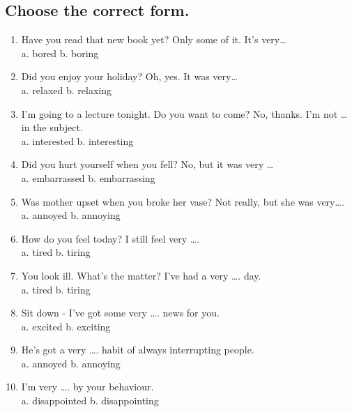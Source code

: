 \subsection*{Choose the correct form.}
\begin{enumerate}
      \item {} Have you read that new book yet?
             Only some of it. It’s very…\\
            a. bored \quad b. boring

      \item {} Did you enjoy your holiday?
             Oh, yes. It was very…\\
            a. relaxed \quad b. relaxing

      \item {} I'm going to a lecture tonight. Do you want to come?
             No, thanks. I'm not … in the subject.\\
            a. interested \quad b. interesting

      \item {} Did you hurt yourself when you fell?
             No, but it was very …\\
            a. embarrassed \quad b. embarrassing

      \item {} Was mother upset when you broke her vase?
             Not really, but she was very….\\
            a. annoyed \quad b. annoying

      \item {} How do you feel today?
             I still feel very ….\\
            a. tired \quad b. tiring

      \item {} You look ill. What’s the matter?
             I’ve had a very …. day.\\
            a. tired \quad b. tiring

      \item Sit down - I've got some very …. news for you.\\
            a. excited \quad b. exciting

      \item He's got a very …. habit of always interrupting people.\\
            a. annoyed \quad b. annoying

      \item I'm very …. by your behaviour.\\
            a. disappointed \quad b. disappointing
\end{enumerate}

